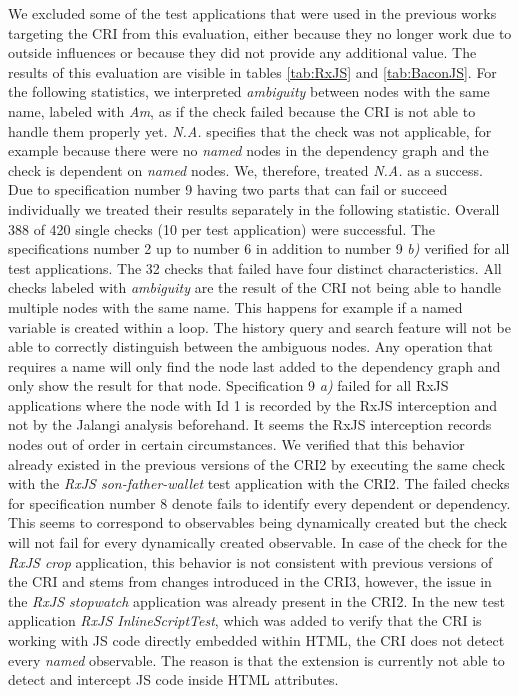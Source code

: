 We excluded some of the test applications that were used in the previous works targeting the CRI from this evaluation, either because they no longer work due to outside influences or because they did not provide any additional value. The results of this evaluation are visible in tables \ref{tab:RxJS} and \ref{tab:BaconJS}. For the following statistics, we interpreted \emph{ambiguity} between nodes with the same name, labeled with \emph{Am}, as if the check failed because the CRI is not able to handle them properly yet. \emph{N.A.} specifies that the check was not applicable, for example because there were no \emph{named} nodes in the dependency graph and the check is dependent on \emph{named} nodes. We, therefore, treated \emph{N.A.} as a success. Due to specification number 9 having two parts that can fail or succeed individually we treated their results separately in the following statistic. Overall 388 of 420 single checks (10 per test application) were successful. The specifications number 2 up to number 6 in addition to number 9 \emph{b)} verified for all test applications. The 32 checks that failed have four distinct characteristics. All checks labeled with \emph{ambiguity} are the result of the CRI not being able to handle multiple nodes with the same name. This happens for example if a named variable is created within a loop. The history query and search feature will not be able to correctly distinguish between the ambiguous nodes. Any operation that requires a name will only find the node last added to the dependency graph and only show the result for that node. Specification 9 \emph{a)} failed for all RxJS applications where the node with Id 1 is recorded by the RxJS interception and not by the Jalangi analysis beforehand. It seems the RxJS interception records nodes out of order in certain circumstances. We verified that this behavior already existed in the previous versions of the CRI2 by executing the same check with the \emph{RxJS son-father-wallet} test application with the CRI2. The failed checks for specification number 8 denote fails to identify every dependent or dependency. This seems to correspond to observables being dynamically created but the check will not fail for every dynamically created observable. In case of the check for the \emph{RxJS crop} application, this behavior is not consistent with previous versions of the CRI and stems from changes introduced in the CRI3, however, the issue in the \emph{RxJS stopwatch} application was already present in the CRI2.
In the new test application \emph{RxJS InlineScriptTest}, which was added to verify that the CRI is working with JS code directly embedded within HTML, the CRI does not detect every \emph{named} observable. The reason is that the extension is currently not able to detect and intercept JS code inside HTML attributes.

